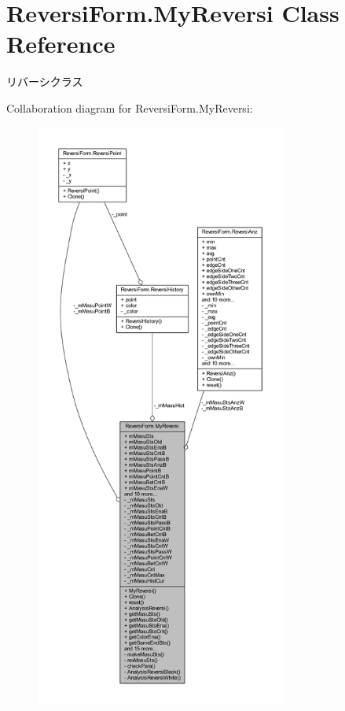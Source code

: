 \hypertarget{class_reversi_form_1_1_my_reversi}{}\section{Reversi\+Form.\+My\+Reversi Class Reference}
\label{class_reversi_form_1_1_my_reversi}


リバーシクラス  




Collaboration diagram for Reversi\+Form.\+My\+Reversi\+:
\nopagebreak
\begin{figure}[H]
\begin{center}
\leavevmode
\includegraphics[height=550pt]{class_reversi_form_1_1_my_reversi__coll__graph}
\end{center}
\end{figure}
